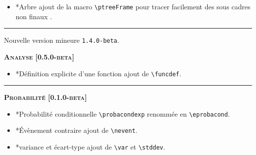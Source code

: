 \documentclass[12pt,a4paper]{book}
\makeatletter
\newcommand\env[1]{\texttt{#1}}
\newcommand\macro[1]{\env{\textbackslash{}#1}}
\theoremstyle{definition}
\newcommand\separation{
	\medskip
	\hfill\rule{0.5\textwidth}{0.75pt}\hfill
	\medskip
}
\newcommand\topic{\@ifstar{\@topic@star}{\@topic@no@star}}
\newcommand\@topic@no@star[1]{%
	\textbf{\textsc{#1}.}%
}
\newcommand\@topic@star[1]{%
	\textbf{\textsc{#1} :}%
}
\makeatother
\begin{document}
{{\begin{description}
    \begin{itemize}[itemsep=.5em]
        \item \topic*{Arbre}
              ajout de la macro \macro{ptreeFrame} pour tracer facilement des sous cadres non \og finaux \fg.
    
        
    \end{itemize}
    
    
    \separation


    \medskip
    \item[2020-07-22] Nouvelle version mineure \verb+1.4.0-beta+.
    
    
    
    
    \begin{center}
        \textbf{\textsc{Analyse [0.5.0-beta]}}
    \end{center}
    
    \begin{itemize}[itemsep=.5em]
        \item \topic*{Définition explicite d'une fonction}
              ajout de \macro{funcdef}.
    
        
    \end{itemize}
    
    
    \separation
    
    
    
    
    \begin{center}
        \textbf{\textsc{Probabilité [0.1.0-beta]}}
    \end{center}
    
    \begin{itemize}[itemsep=.5em]
        \item \topic*{Probabilité conditionnelle}
              \macro{probacondexp} renommée en  \macro{eprobacond}.
    
    
        
    
        \item \topic*{Évènement contraire}
              ajout de \macro{nevent}.
    
    
        
    
        \item \topic*{variance et écart-type}
              ajout de \macro{var} et \macro{stddev}.
    

\end{itemize}
\end{description}}}
\end{document}
